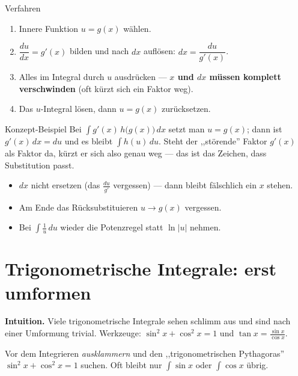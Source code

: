 \documentclass[a4paper,11pt]{article}
\begin{document}
\begin{satzbox}{Verfahren}
\begin{enumerate}[leftmargin=1.6em,itemsep=2pt]
  \item Innere Funktion $u=g(x)$ wählen.
  \item $\dfrac{du}{dx}=g'(x)$ bilden und nach $dx$ auflösen: $dx=\dfrac{du}{g'(x)}$.
  \item Alles im Integral durch $u$ ausdrücken — \textbf{$x$ und $dx$ müssen komplett
        verschwinden} (oft kürzt sich ein Faktor weg).
  \item Das $u$-Integral lösen, dann $u=g(x)$ zurücksetzen.
\end{enumerate}
\end{satzbox}

\begin{bspbox}{Konzept-Beispiel}
Bei $\int g'(x)\,h\bigl(g(x)\bigr)\,dx$ setzt man $u=g(x)$; dann ist $g'(x)\,dx=du$ und es bleibt
$\int h(u)\,du$. Steht der ,,störende'' Faktor $g'(x)$ als Faktor da, kürzt er sich also genau
weg — das ist das Zeichen, dass Substitution passt.
\end{bspbox}

\begin{fehlerbox}
\begin{itemize}[leftmargin=1.4em,itemsep=2pt]
  \item $dx$ nicht ersetzen (das $\frac{du}{g'}$ vergessen) — dann bleibt fälschlich ein $x$ stehen.
  \item Am Ende das Rücksubstituieren $u\to g(x)$ vergessen.
  \item Bei $\int\frac1u\,du$ wieder die Potenzregel statt $\ln|u|$ nehmen.
\end{itemize}
\end{fehlerbox}

\section{Trigonometrische Integrale: erst umformen}

\textbf{Intuition.} Viele trigonometrische Integrale sehen schlimm aus und sind nach einer
Umformung trivial. Werkzeuge: $\sin^2x+\cos^2x=1$ und $\tan x=\frac{\sin x}{\cos x}$.

\begin{merkbox}
Vor dem Integrieren \emph{ausklammern} und den ,,trigonometrischen Pythagoras''
$\sin^2x+\cos^2x=1$ suchen. Oft bleibt nur $\int\sin x$ oder $\int\cos x$ übrig.
\end{merkbox}
\end{document}
